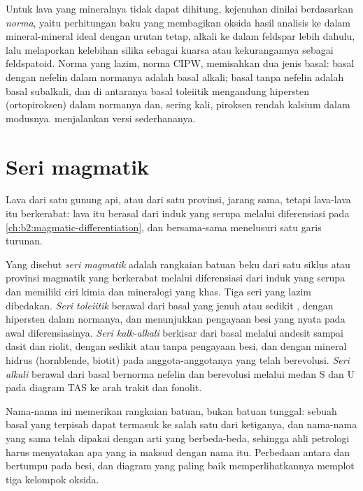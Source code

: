 Untuk lava yang mineralnya tidak dapat dihitung, kejenuhan dinilai berdasarkan \emph{norma}, yaitu
perhitungan baku yang membagikan oksida hasil analisis ke dalam mineral-mineral ideal
dengan urutan tetap, alkali ke dalam feldspar lebih dahulu, lalu melaporkan kelebihan silika sebagai
kuarsa atau kekurangannya sebagai feldspatoid. Norma yang lazim, norma CIPW, memisahkan
dua jenis basal: basal dengan nefelin dalam normanya adalah basal alkali; basal
tanpa nefelin adalah basal subalkali, dan di antaranya basal toleiitik mengandung
hipersten (ortopiroksen) dalam normanya dan, sering kali, piroksen rendah kalsium dalam modusnya.
 menjalankan versi sederhananya.

\section{Seri magmatik}\label{sec:b2:magmatic-series:series}

Lava dari satu gunung api, atau dari satu provinsi, jarang sama, tetapi lava-lava itu berkerabat: lava itu
berasal dari  induk yang serupa melalui diferensiasi pada
\cref{ch:b2:magmatic-differentiation}, dan bersama-sama menelusuri satu garis turunan.

\begin{definition}\label{def:b2:magmatic-series:series}
Yang disebut \emph{seri magmatik} adalah rangkaian batuan beku dari satu
siklus atau provinsi magmatik yang berkerabat melalui diferensiasi dari  induk yang serupa dan
memiliki ciri kimia dan mineralogi yang khas. Tiga seri yang lazim
dibedakan. \emph{Seri toleiitik} berawal dari
basal yang jenuh atau sedikit , dengan hipersten dalam normanya,
dan menunjukkan pengayaan besi yang nyata pada awal diferensiasinya.
\emph{Seri kalk-alkali} berkisar dari basal melalui
andesit sampai dasit dan riolit, dengan sedikit atau tanpa pengayaan besi, dan dengan
mineral hidrus (hornblende, biotit) pada anggota-anggotanya yang telah berevolusi. \emph{Seri
alkali} berawal dari basal bernorma nefelin dan berevolusi
melalui medan S dan U pada diagram TAS ke arah trakit dan fonolit.
\end{definition}

Nama-nama ini memerikan rangkaian batuan, bukan batuan tunggal: sebuah basal yang terpisah dapat termasuk ke salah satu
dari ketiganya, dan nama-nama yang sama telah dipakai dengan arti yang berbeda-beda, sehingga ahli petrologi
harus menyatakan apa yang ia maksud dengan nama itu. Perbedaan antara  dan
 bertumpu pada besi, dan diagram yang paling baik memperlihatkannya memplot tiga
kelompok oksida.


